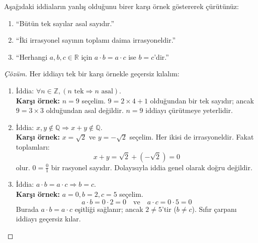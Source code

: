 \begin{example}
Aşağıdaki iddiaların yanlış olduğunu birer karşı örnek göstererek çürütünüz:
\begin{enumerate}
  \item ``Bütün tek sayılar asal sayıdır.''
  \item ``İki irrasyonel sayının toplamı daima irrasyoneldir.''
  \item ``Herhangi $a, b, c \in \mathbb{R}$ için $a \cdot b = a \cdot c$ ise $b = c$'dir.''
\end{enumerate}
\end{example}
\begin{proof}[Çözüm]
Her iddiayı tek bir karşı örnekle geçersiz kılalım:
\begin{enumerate}
  \item İddia: $\forall n \in \mathbb{Z}, (n \text{ tek} \Rightarrow n \text{ asal})$.\\
  \textbf{Karşı örnek:} $n = 9$ seçelim. $9 = 2 \times 4 + 1$ olduğundan bir tek sayıdır; ancak $9 = 3 \times 3$ olduğundan asal değildir. $n=9$ iddiayı çürütmeye yeterlidir.
  
  \item İddia: $x, y \notin \mathbb{Q} \Rightarrow x + y \notin \mathbb{Q}$.\\
  \textbf{Karşı örnek:} $x = \sqrt{2}$ ve $y = -\sqrt{2}$ seçelim. Her ikisi de irrasyoneldir. Fakat toplamları:
  \[ x + y = \sqrt{2} + (-\sqrt{2}) = 0 \]
  olur. $0 = \frac{0}{1}$ bir rasyonel sayıdır. Dolayısıyla iddia genel olarak doğru değildir.

  \item İddia: $a \cdot b = a \cdot c \Rightarrow b = c$.\\
  \textbf{Karşı örnek:} $a = 0, b = 2, c = 5$ seçelim.
  \[ a \cdot b = 0 \cdot 2 = 0 \quad \text{ve} \quad a \cdot c = 0 \cdot 5 = 0 \]
  Burada $a \cdot b = a \cdot c$ eşitliği sağlanır; ancak $2 \neq 5$'tir ($b \neq c$). Sıfır çarpanı iddiayı geçersiz kılar.
\end{enumerate}
\end{proof}

